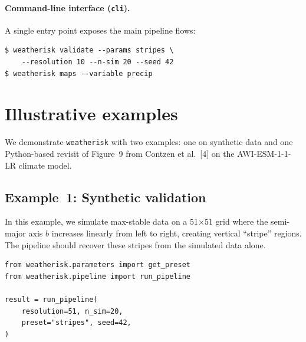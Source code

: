 \documentclass[preprint,12pt,a4paper]{elsarticle}
\newcommand{\rev}[1]{{#1}}
\newcommand{\revb}[1]{{\color{RevisionBlue}#1}}
\begin{document}
\paragraph{Command-line interface (\texttt{cli}).}
A single entry point exposes the main pipeline flows:
\begin{lstlisting}[numbers=none]
$ weatherisk validate --params stripes \
    --resolution 10 --n-sim 20 --seed 42
$ weatherisk maps --variable precip
\end{lstlisting}

\section{Illustrative examples}
\label{sec:examples}

We demonstrate \texttt{weatherisk} with \rev{two} examples: one on
synthetic data \rev{and one \revb{Python-based revisit of Figure~9 from Contzen}
et al.~[4] on the AWI-ESM-1-1-LR climate model}.

\subsection{Example~1: Synthetic validation}
\label{sec:ex-synthetic}

In this example, we simulate max-stable data on a 51$\times$51 grid
where the semi-major axis $b$ increases linearly from left to right,
creating vertical ``stripe'' regions.  The pipeline should recover
these stripes from the simulated data alone.

\begin{lstlisting}[caption={Running the stripes validation.},
  label=lst:validate]
from weatherisk.parameters import get_preset
from weatherisk.pipeline import run_pipeline

result = run_pipeline(
    resolution=51, n_sim=20,
    preset="stripes", seed=42,
)
\end{lstlisting}
\end{document}
